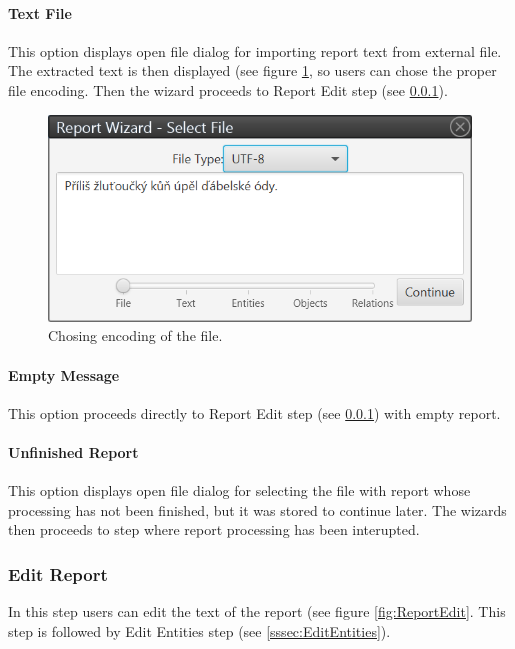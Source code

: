\documentclass[12pt,a4paper]{report}
\begin{document}
\paragraph{Text File} This option displays open file dialog for importing
report text from external file. The extracted text is then displayed (see
figure \ref{fig:TextFile}, so users can chose the proper file encoding. Then
the wizard proceeds to Report Edit step (see \ref{sssec:ReportEdit}).

\begin{figure}[!htb]
        \centering
        \includegraphics[width=\textwidth]{Images/textfile}
        \caption{Chosing encoding of the file.}
        \label{fig:TextFile}
\end{figure}

\paragraph{Empty Message} This option proceeds directly to Report Edit step
(see \ref{sssec:ReportEdit}) with empty report.

\paragraph{Unfinished Report} This option displays open file dialog for
selecting the file with report whose processing has not been finished, but it
was stored to continue later. The wizards then proceeds to step where report
processing has been interupted.

\subsubsection{Edit Report}
\label{sssec:ReportEdit}

In this step users can edit the text of the report (see figure
\ref{fig:ReportEdit}. This step is followed by Edit Entities step (see
\ref{sssec:EditEntities}).
\end{document}
